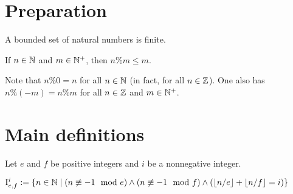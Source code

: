 %



\chapter{Preparation}

\begin{lemma}
\label{lem:finite_of_bounded_of_Nat}
\leanok
A bounded set of natural numbers is finite.
\end{lemma}

\begin{lemma}
\label{lem:nat_mod_pnat_le}
\leanok
If $n \in \mathbb{N}$ and $m \in \mathbb{N}^+$,
then $n \% m \le m$.
\end{lemma}

\begin{remark}
Note that $n \% 0 = n$ for all $n \in \mathbb{N}$
(in fact, for all $n \in \mathbb{Z}$).
One also has $n \% (-m) = n \% m$
for all
$n \in \mathbb{Z}$
and
$m \in \mathbb{N}^+$.
\end{remark}

\chapter{Main definitions}

Let $e$ and $f$ be positive integers
and $i$ be a nonnegative integer.

\begin{definition}
\label{def:setI}
\leanok
$
\mathrm{I}_{e,f}^i
:=
\{
n \in \mathbb{N}
\mid
(n \not \equiv - 1 \mod e)
\wedge
(n \not \equiv - 1 \mod f)
\wedge
(\lfloor n / e \rfloor + \lfloor n / f \rfloor = i)
\}
$
\end{definition}

